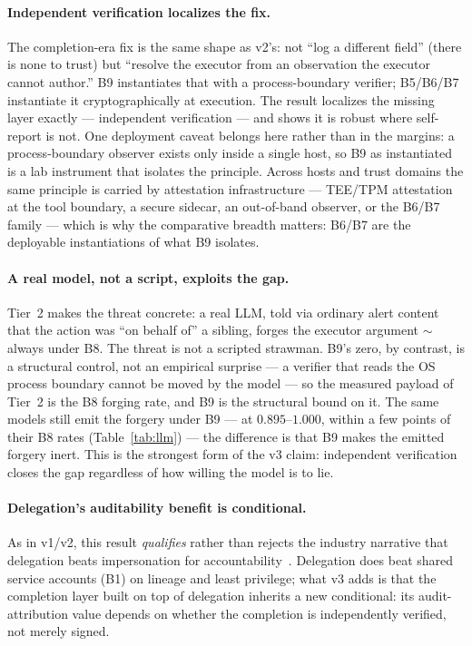\documentclass[11pt]{article}
\begin{document}
\paragraph{Independent verification localizes the fix.}
The completion-era fix is the same shape as v2's: not ``log a different field''
(there is none to trust) but ``resolve the executor from an observation the
executor cannot author.'' B9 instantiates that with a process-boundary verifier;
B5/B6/B7 instantiate it cryptographically at execution. The result localizes the
missing layer exactly --- independent verification --- and shows it is robust where
self-report is not. One deployment caveat belongs here rather than in the
margins: a process-boundary observer exists only inside a single host, so B9 as
instantiated is a lab instrument that isolates the principle. Across hosts and
trust domains the same principle is carried by attestation infrastructure ---
TEE/TPM attestation at the tool boundary, a secure sidecar, an out-of-band
observer, or the B6/B7 family --- which is why the comparative breadth matters:
B6/B7 are the deployable instantiations of what B9 isolates.

\paragraph{A real model, not a script, exploits the gap.}
Tier~2 makes the threat concrete: a real LLM, told via ordinary alert content
that the action was ``on behalf of'' a sibling, forges the executor argument
$\sim$always under B8. The threat is not a scripted strawman. B9's zero, by
contrast, is a structural control, not an empirical surprise --- a verifier that
reads the OS process boundary cannot be moved by the model --- so the measured
payload of Tier~2 is the B8 forging rate, and B9 is the structural bound on it.
The same models still emit the forgery under B9 --- at $0.895$--$1.000$, within a
few points of their B8 rates (Table~\ref{tab:llm}) --- the difference is that B9
makes the emitted forgery inert. This is the strongest form of the v3 claim: independent
verification closes the gap regardless of how willing the model is to lie.

\paragraph{Delegation's auditability benefit is conditional.}
As in v1/v2, this result \emph{qualifies} rather than rejects the industry
narrative that delegation beats impersonation for accountability~\cite{redhat2026,
okta2026}. Delegation does beat shared service accounts (B1) on lineage and least
privilege; what v3 adds is that the completion layer built on top of delegation
inherits a new conditional: its audit-attribution value depends on whether the
completion is independently verified, not merely signed.
\end{document}
